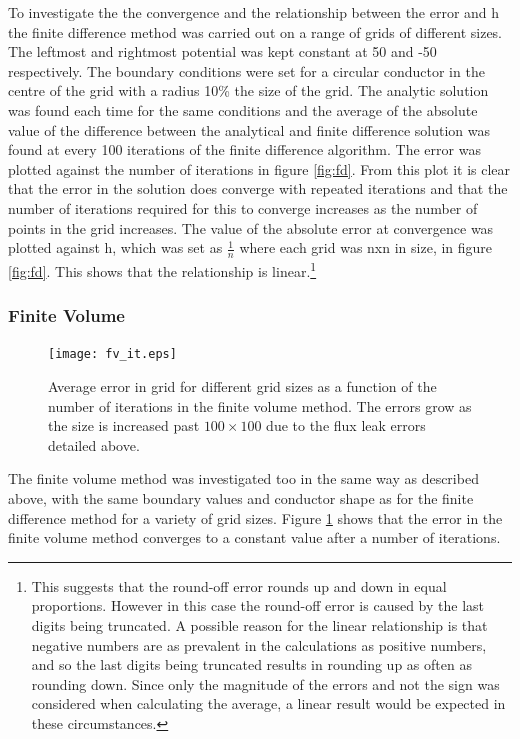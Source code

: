 \documentclass[aps,twocolumn,pre,nofootinbib,10pt]{revtex4-1}
\begin{document}
To investigate the the convergence and the relationship between the error and h the finite difference method was carried out on a range of grids of different sizes. The leftmost and rightmost potential was kept constant at 50 and -50 respectively. The boundary conditions were set for a circular conductor in the centre of the grid with a radius 10\% the size of the grid. The analytic solution was found each time for the same conditions and the average of the absolute value of the difference between the analytical and finite difference solution was found at every 100 iterations of the finite difference algorithm. The error was plotted against the number of iterations in figure \ref{fig:fd}. From this plot it is clear that the error in the solution does converge with repeated iterations and that the number of iterations required for this to converge increases as the number of points in the grid increases. 
The value of the absolute error at convergence was plotted against h, which was set as \(\frac{1}{n}\) where each grid was nxn in size, in figure \ref{fig:fd}. This shows that the relationship is linear.\footnote{This suggests that the round-off error rounds up and down in equal proportions. However in this case the round-off error is caused by the last digits being truncated. A possible reason for the linear relationship is that negative numbers are as prevalent in the calculations as positive numbers, and so the last digits being truncated results in rounding up as often as rounding down. Since only the magnitude of the errors and not the sign was considered when calculating the average, a linear result would be expected in these circumstances.}

\subsubsection{Finite Volume}

\begin{figure}
\texttt{[image: fv\_it.eps]}
\caption{Average error in grid for different grid sizes as a function of the number of iterations in the finite volume method. The errors grow as the size is increased past $100 \times 100$ due to the flux leak errors detailed above.}
\label{fig:fv}
\end{figure}

The finite volume method was investigated too in the same way as described above, with the same boundary values and conductor shape as for the finite difference method for a variety of grid sizes. Figure \ref{fig:fv} shows that the error in the finite volume method converges to a constant value after a number of iterations.
\end{document}
